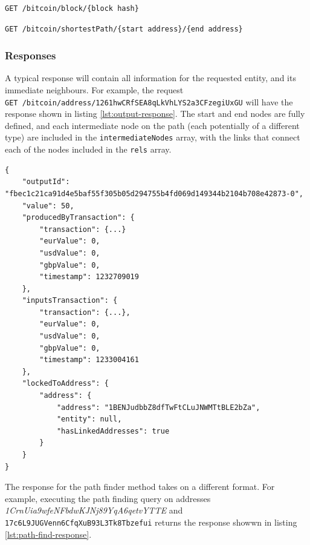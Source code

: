 \begin{lstlisting}[caption={Get a block with a unique block hash}, breaklines=true, basicstyle=\small]
GET /bitcoin/block/{block hash}
\end{lstlisting}

\begin{lstlisting}[caption={Find a path between two addresses using their full address strings}, breaklines=true, basicstyle=\small]
GET /bitcoin/shortestPath/{start address}/{end address}
\end{lstlisting}

\subsubsection{Responses}
A typical response will contain all information for the requested entity, and its immediate neighbours. For example, the request \\\texttt{GET /bitcoin/address/1261hwCRfSEA8qLkVhLYS2a3CFzegiUxGU} will have the response shown in listing \ref{lst:output-response}. The start and end nodes are fully defined, and each intermediate node on the path (each potentially of a different type) are included in the \texttt{intermediateNodes} array, with the links that connect each of the nodes included in the \texttt{rels} array. 

\begin{lstlisting}[label={lst:output-response}, caption={GET Output Example Response}, breaklines=true, basicstyle=\small]
{
    "outputId": "fbec1c21ca91d4e5baf55f305b05d294755b4fd069d149344b2104b708e42873-0",
    "value": 50,
    "producedByTransaction": {
        "transaction": {...}
        "eurValue": 0,
        "usdValue": 0,
        "gbpValue": 0,
        "timestamp": 1232709019
    },
    "inputsTransaction": {
        "transaction": {...},
        "eurValue": 0,
        "usdValue": 0,
        "gbpValue": 0,
        "timestamp": 1233004161
    },
    "lockedToAddress": {
        "address": {
            "address": "1BENJudbbZ8dfTwFtCLuJNWMTtBLE2bZa",
            "entity": null,
            "hasLinkedAddresses": true
        }
    }
}
\end{lstlisting}

The response for the path finder method takes on a different format. For example, executing the path finding query on addresses \textit{1CrnUia9wfeNFbdwKJNj89YqA6qetvYTTE} and \texttt{17c6L9JUGVenn6CfqXuB93L3Tk8Tbzefui} returns the response showwn in listing \ref{lst:path-find-response}.

